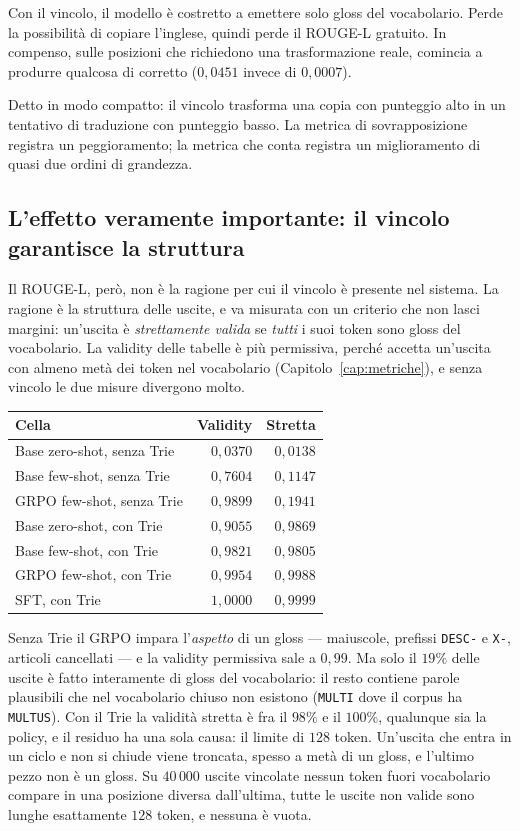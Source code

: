 Con il vincolo, il modello è costretto a emettere solo gloss del vocabolario.
Perde la possibilità di copiare l'inglese, quindi perde il ROUGE-L gratuito. In
compenso, sulle posizioni che richiedono una trasformazione reale, comincia a
produrre qualcosa di corretto ($0{,}0451$ invece di $0{,}0007$).

Detto in modo compatto: il vincolo trasforma una copia con punteggio alto in un
tentativo di traduzione con punteggio basso. La metrica di sovrapposizione
registra un peggioramento; la metrica che conta registra un miglioramento di
quasi due ordini di grandezza.

\subsection{L'effetto veramente importante: il vincolo garantisce la struttura}

Il ROUGE-L, però, non è la ragione per cui il vincolo è presente nel sistema. La
ragione è la struttura delle uscite, e va misurata con un criterio che non lasci
margini: un'uscita è \emph{strettamente valida} se \emph{tutti} i suoi token sono
gloss del vocabolario. La validity delle tabelle è più permissiva, perché accetta
un'uscita con almeno metà dei token nel vocabolario
(Capitolo~\ref{cap:metriche}), e senza vincolo le due misure divergono molto.

\begin{center}
\begin{tabular}{lrr}
\toprule
Cella & Validity & Stretta \\
\midrule
Base zero-shot, senza Trie & $0{,}0370$ & $0{,}0138$ \\
Base few-shot, senza Trie & $0{,}7604$ & $0{,}1147$ \\
GRPO few-shot, senza Trie & $0{,}9899$ & $0{,}1941$ \\
\midrule
Base zero-shot, con Trie & $0{,}9055$ & $0{,}9869$ \\
Base few-shot, con Trie & $0{,}9821$ & $0{,}9805$ \\
GRPO few-shot, con Trie & $0{,}9954$ & $0{,}9988$ \\
SFT, con Trie & $1{,}0000$ & $0{,}9999$ \\
\bottomrule
\end{tabular}
\end{center}

Senza Trie il GRPO impara l'\emph{aspetto} di un gloss --- maiuscole, prefissi
\texttt{DESC-} e \texttt{X-}, articoli cancellati --- e la validity permissiva
sale a $0{,}99$. Ma solo il $19\%$ delle uscite è fatto interamente di gloss del
vocabolario: il resto contiene parole plausibili che nel vocabolario chiuso non
esistono (\texttt{MULTI} dove il corpus ha \texttt{MULTUS}). Con il Trie la
validità stretta è fra il $98\%$ e il $100\%$, qualunque sia la policy, e il
residuo ha una sola causa: il limite di $128$ token. Un'uscita che entra in un
ciclo e non si chiude viene troncata, spesso a metà di un gloss, e l'ultimo pezzo
non è un gloss. Su $40\,000$ uscite vincolate nessun token fuori vocabolario
compare in una posizione diversa dall'ultima, tutte le uscite non valide sono
lunghe esattamente $128$ token, e nessuna è vuota.

